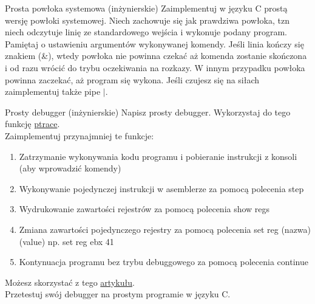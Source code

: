 \begin{exercise}{Prosta powłoka systemowa (inżynierskie)}{}
Zaimplementuj w języku C prostą wersję powłoki systemowej. Niech zachowuje się jak prawdziwa powłoka, tzn niech odczytuje linię ze standardowego wejścia i wykonuje podany program. Pamiętaj o ustawieniu argumentów wykonywanej komendy. Jeśli linia kończy się znakiem (\&), wtedy powłoka nie powinna czekać aż komenda zostanie skończona i od razu wrócić do trybu oczekiwania na rozkazy. W innym przypadku powłoka powinna zaczekać, aż program się wykona. Jeśli czujesz się na siłach zaimplementuj także pipe $\mid$.
\end{exercise}

\clearpage

\begin{exercise}{Prosty debugger (inżynierskie)}{}
Napisz prosty debugger. Wykorzystaj do tego funkcję \href{http://man7.org/linux/man-pages/man2/ptrace.2.html}{ptrace}. \\
Zaimplementuj przynajmniej te funkcje:
\begin{enumerate}
    \item Zatrzymanie wykonywania kodu programu i pobieranie instrukcji z konsoli (aby wprowadzić komendy)
    \item Wykonywanie pojedynczej instrukcji w asemblerze za pomocą polecenia step
    \item Wydrukowanie zawartości rejestrów za pomocą polecenia show regs
    \item Zmiana zawartości pojedynczego rejestry za pomocą polecenia set reg (nazwa) (value) np. set reg ebx 41
    \item Kontynuacja programu bez trybu debuggowego za pomocą polecenia continue
\end{enumerate}

Możesz skorzystać z tego \href{https://www.linuxjournal.com/article/6100?page=0,3}{artykułu}. \\
Przetestuj swój debugger na prostym programie w języku C.
\end{exercise}

